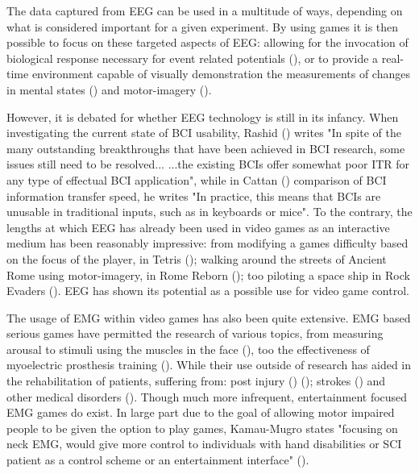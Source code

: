 \documentclass[11pt, a4paper]{article}
\newcommand{\citethis}[1]{(\cite{#1})}
\begin{document}
The data captured from EEG can be used in a multitude of ways, depending on what is considered important for a given experiment. By using games it is then possible to focus on these targeted aspects of EEG: allowing for the invocation of biological response necessary for event related potentials \citethis{ahn2011using}, or to provide a real-time environment capable of visually demonstration the measurements of changes in mental states \citethis{liarokapis2015examining} and motor-imagery \citethis{ndulue2019driving}. 

However, it is debated for whether EEG technology is still in its infancy. When investigating the current state of BCI usability, Rashid \citethis{rashid2020current} writes "In spite of the many outstanding breakthroughs that have been achieved in BCI research, some issues still need to be resolved...  ...the existing BCIs offer somewhat poor ITR for any type of effectual BCI application", while in Cattan \citethis{cattan2021use} comparison of BCI information transfer speed, he writes "In practice, this means that BCIs are unusable in traditional inputs, such as in keyboards or mice". To the contrary, the lengths at which EEG has already been used in video games as an interactive medium has been reasonably impressive: from modifying a games difficulty based on the focus of the player, in Tetris \citethis{liarokapis2015examining}; walking around the streets of Ancient Rome using motor-imagery, in Rome Reborn \citethis{ndulue2019driving}; too piloting a space ship in Rock Evaders \citethis{ndulue2019driving}. EEG has shown its potential as a possible use for video game control.

\hfill

The usage of EMG within video games has also been quite extensive. EMG based serious games have permitted the research of various topics, from measuring arousal to stimuli using the muscles in the face \citethis{schuurink2008engagement}, too the effectiveness of myoelectric prosthesis training \citethis{bessa2020designing}. While their use outside of research has aided in the rehabilitation of patients, suffering from: post injury \citethis{gutierrez2020serious} \citethis{schonauer2011full}; strokes \citethis{ghassemi2019development} and other medical disorders \citethis{labruyere2013requirements}. Though much more infrequent, entertainment focused EMG games do exist. In large part due to the goal of allowing motor impaired people to be given the option to play games, Kamau-Mugro states "focusing on neck EMG, would give more control to individuals with hand disabilities or SCI patient as a control scheme or an entertainment interface" \citethis{muguro2020development}.
\end{document}
